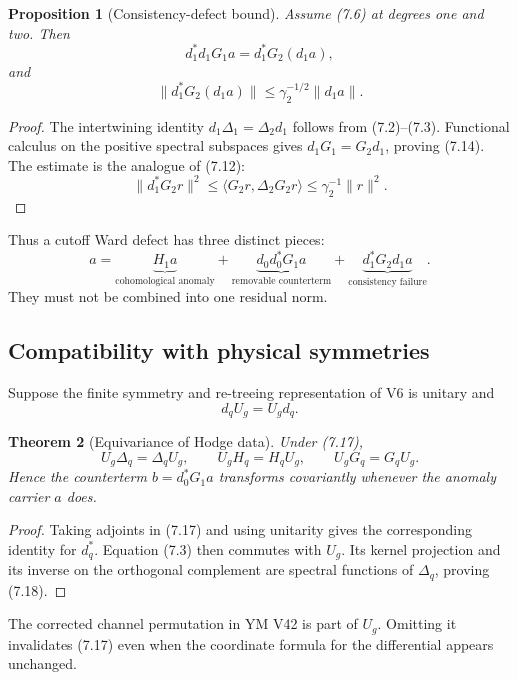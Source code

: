 \documentclass[11pt]{article}
\newtheorem{theorem}{Theorem}[section]
\newtheorem{proposition}[theorem]{Proposition}
\theoremstyle{remark}
\begin{document}
\begin{proposition}[Consistency-defect bound]
\label{prop:v12v7-consistency}
Assume (7.6) at degrees one and two.  Then
\[
 d_1^*d_1G_1a=d_1^*G_2(d_1a),                              \tag{7.14}
\]
and
\[
 \|d_1^*G_2(d_1a)\|
                              \le\gamma_2^{-1/2}\|d_1a\|.    \tag{7.15}
\]
\end{proposition}

\begin{proof}
The intertwining identity
\(d_1\Delta_1=\Delta_2d_1\) follows from (7.2)--(7.3).
Functional calculus on the positive spectral subspaces gives
\(d_1G_1=G_2d_1\), proving (7.14).  The estimate is the analogue of
(7.12):
\[
 \|d_1^*G_2r\|^2
 \le\langle G_2r,\Delta_2G_2r\rangle
 \le\gamma_2^{-1}\|r\|^2.
\]
\end{proof}

Thus a cutoff Ward defect has three distinct pieces:
\[
 \boxed{
 a=\underbrace{H_1a}_{\text{cohomological anomaly}}
 +\underbrace{d_0d_0^*G_1a}_{\text{removable counterterm}}
 +\underbrace{d_1^*G_2d_1a}_{\text{consistency failure}}.}   \tag{7.16}
\]
They must not be combined into one residual norm.

\subsection{Compatibility with physical symmetries}

Suppose the finite symmetry and re-treeing representation of V6 is
unitary and
\[
                              d_qU_g=U_gd_q.                 \tag{7.17}
\]

\begin{theorem}[Equivariance of Hodge data]
\label{thm:v12v7-equivariant}
Under (7.17),
\[
 U_g\Delta_q=\Delta_qU_g,\qquad
 U_gH_q=H_qU_g,\qquad
 U_gG_q=G_qU_g.                                             \tag{7.18}
\]
Hence the counterterm \(b=d_0^*G_1a\) transforms covariantly whenever
the anomaly carrier \(a\) does.
\end{theorem}

\begin{proof}
Taking adjoints in (7.17) and using unitarity gives the corresponding
identity for \(d_q^*\).  Equation (7.3) then commutes with \(U_g\).
Its kernel projection and its inverse on the orthogonal complement
are spectral functions of \(\Delta_q\), proving (7.18).
\end{proof}

The corrected channel permutation in YM V42 is part of \(U_g\).
Omitting it invalidates (7.17) even when the coordinate formula for
the differential appears unchanged.
\end{document}
